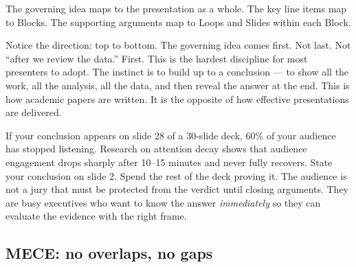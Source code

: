 \vspace{0.5em}

The governing idea maps to the presentation as a whole. The key line items map to Blocks. The supporting arguments map to Loops and Slides within each Block.

Notice the direction: top to bottom. The governing idea comes first. Not last. Not ``after we review the data.'' First. This is the hardest discipline for most presenters to adopt. The instinct is to build up to a conclusion --- to show all the work, all the analysis, all the data, and then reveal the answer at the end. This is how academic papers are written. It is the opposite of how effective presentations are delivered.

\begin{alertbox}
If your conclusion appears on slide 28 of a 30-slide deck, 60\% of your audience has stopped listening. Research on attention decay shows that audience engagement drops sharply after 10--15 minutes and never fully recovers. State your conclusion on slide 2. Spend the rest of the deck proving it. The audience is not a jury that must be protected from the verdict until closing arguments. They are busy executives who want to know the answer \emph{immediately} so they can evaluate the evidence with the right frame.
\end{alertbox}


\subsection{MECE: no overlaps, no gaps}


